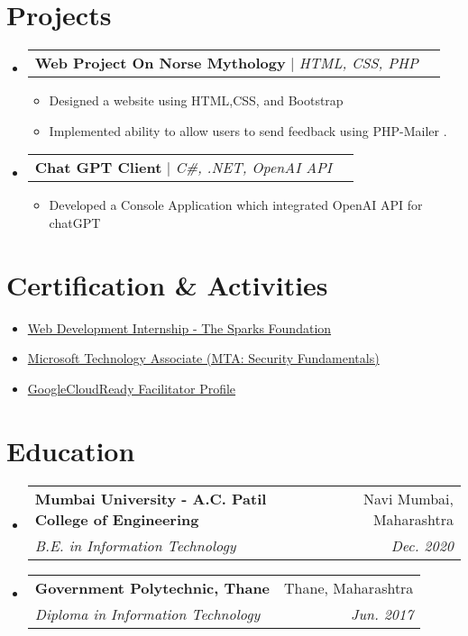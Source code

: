 \documentclass[letterpaper,11pt]{article}
\makeatletter
\newcommand{\resumeItem}[1]{
  \item\small{
    {#1 \vspace{-2pt}}
  }
}
\newcommand{\resumeSubheading}[4]{
  \vspace{-2pt}\item
    \begin{tabular*}{0.97\textwidth}[t]{l@{\extracolsep{\fill}}r}
      \textbf{#1} & #2 \\
      \textit{\small#3} & \textit{\small #4} \\
    \end{tabular*}\vspace{-7pt}
}
\newcommand{\resumeProjectHeading}[2]{
    \item
    \begin{tabular*}{0.97\textwidth}{l@{\extracolsep{\fill}}r}
      \small#1 & #2 \\
    \end{tabular*}\vspace{-7pt}
}
\newcommand{\resumeSubHeadingListStart}{\begin{itemize}[leftmargin=0.15in, label={}]}
\newcommand{\resumeSubHeadingListEnd}{\end{itemize}}
\newcommand{\resumeItemListStart}{\begin{itemize}}
\newcommand{\resumeItemListEnd}{\end{itemize}\vspace{-5pt}}
\makeatother
\begin{document}
\section{Projects}
    \resumeSubHeadingListStart
      \resumeProjectHeading
          {\textbf{Web Project On Norse Mythology} $|$ \emph{HTML, CSS, PHP}}{}
          \resumeItemListStart
            \resumeItem{Designed a website using HTML,CSS, and Bootstrap}
            \resumeItem{Implemented ability to allow users to send feedback using PHP-Mailer .}
          \resumeItemListEnd
      \resumeProjectHeading
          {\textbf{Chat GPT Client } $|$ \emph{C\#, .NET, OpenAI API}}{}
          \resumeItemListStart
            \resumeItem{Developed a Console Application which integrated OpenAI API for chatGPT }
          \resumeItemListEnd
    \resumeSubHeadingListEnd
\section{Certification \& Activities}
    \resumeSubHeadingListStart
        \resumeItemListStart
            \resumeItem{\href{https://drive.google.com/file/d/1Lpkbt5iVnXtadE8H2wnr1fBPywnXntYY/view?usp=sharing}{Web Development Internship - The Sparks Foundation}}
            \resumeItem{\href{https://www.youracclaim.com/badges/4a36f993-4157-4684-b65b-b9fb2c14d9bb}{Microsoft Technology Associate (MTA: Security Fundamentals)}}
            \resumeItem{\href{https://www.cloudskillsboost.google/public_profiles/d451f106-d88a-4502-87c2-182a85196922}{GoogleCloudReady Facilitator Profile}}
        \resumeItemListEnd
    \resumeSubHeadingListEnd
\section{Education}
  \resumeSubHeadingListStart
    \resumeSubheading
      {Mumbai University  - A.C. Patil College of Engineering}{Navi Mumbai, Maharashtra}
      {B.E. in Information Technology }{Dec. 2020}
    \resumeSubheading
      {Government Polytechnic, Thane }{Thane, Maharashtra}
      {Diploma in Information Technology}{Jun. 2017}
  \resumeSubHeadingListEnd
\end{document}
